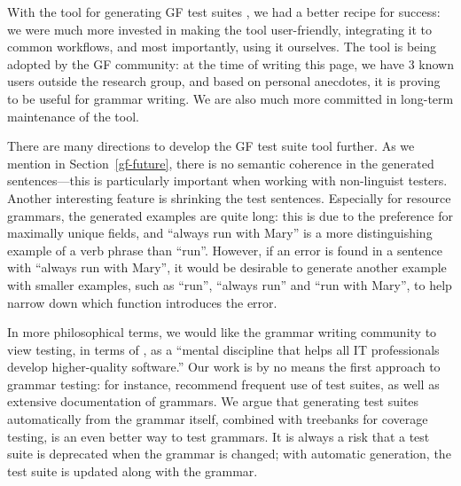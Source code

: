 

With the tool for generating GF test suites
\cite{listenmaa_claessen2018}, we had a better recipe for success: we
were much more invested in making the tool user-friendly, integrating
it to common workflows, and most importantly, using it ourselves. The
tool is being adopted by the GF community: at the time of writing this
page, we have 3 known users outside the research group, and based on
personal anecdotes, it is proving to be useful for grammar writing. We
are also much more committed in long-term maintenance of the tool.

There are many directions to develop the GF test suite tool further.
As we mention in Section~\ref{gf-future}, there is no semantic
coherence in the generated sentences---this is particularly important
when working with non-linguist testers.  Another interesting feature
is shrinking the test sentences. Especially for resource grammars, the
generated examples are quite long: this is due to the preference for
maximally unique fields, and ``always run with Mary'' is a more
distinguishing example of a verb phrase than ``run''. However, if an
error is found in a sentence with ``always run with Mary'', it would
be desirable to generate another example with smaller examples, such
as ``run'', ``always run'' and ``run with Mary'', to help narrow down
which function introduces the error.

In more philosophical terms, we would like the grammar writing
community to view testing, in terms of \citet{beizer2003software}, as
a ``mental discipline that helps all IT professionals develop
higher-quality software.''  Our work is by no means the first approach
to grammar testing: for instance, \citet{butt1999lfg} recommend
frequent use of test suites, as well as extensive documentation of
grammars. We argue that generating test suites automatically from the
grammar itself, combined with treebanks for coverage testing, is an
even better way to test grammars. It is always a risk that a test
suite is deprecated when the grammar is changed; with automatic
generation, the test suite is updated along with the grammar.



